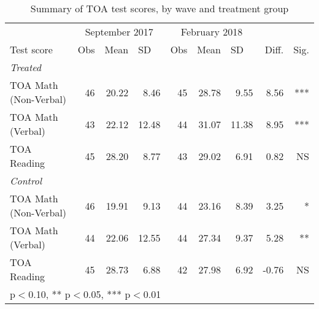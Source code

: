 \begin{table}[htbp]
  \centering
  \caption{Summary of TOA test scores, by wave and treatment group}
    \begin{tabular}{lrrrrrrrr}
    \toprule
          & \multicolumn{3}{c}{September 2017} & \multicolumn{3}{c}{February 2018} &       &  \\\cmidrule(lr){2-4}\cmidrule(lr){5-7}
    Test score & \multicolumn{1}{l}{Obs} & \multicolumn{1}{l}{Mean} & \multicolumn{1}{l}{SD} & \multicolumn{1}{l}{Obs} & \multicolumn{1}{l}{Mean} & \multicolumn{1}{l}{SD} & Diff. & Sig. \\
    \midrule
    \multicolumn{1}{l}{\textit{Treated}} &       &       &       &       &       &       &       &  \\
    TOA Math (Non-Verbal) & 46    & 20.22 & 8.46  & 45    & 28.78 & 9.55  & 8.56  & *** \\
    TOA Math (Verbal) & 43    & 22.12 & 12.48 & 44    & 31.07 & 11.38 & 8.95  & *** \\
    TOA Reading & 45    & 28.20 & 8.77  & 43    & 29.02 & 6.91  & 0.82  & NS \\
    \multicolumn{1}{l}{\textit{Control}} &       &       &       &       &       &       &       &  \\
    TOA Math (Non-Verbal) & 46    & 19.91 & 9.13  & 44    & 23.16 & 8.39  & 3.25  & * \\
    TOA Math (Verbal) & 44    & 22.06 & 12.55 & 44    & 27.34 & 9.37  & 5.28  & ** \\
    TOA Reading & 45    & 28.73 & 6.88  & 42    & 27.98 & 6.92  & -0.76 & NS \\
    \bottomrule
    \multicolumn{9}{l}{\footnotesize * p$<$0.10, ** p$<$0.05, *** p$<$0.01}\\
    \end{tabular}%
  \label{tab:sum_by_wave}%
\end{table}%
